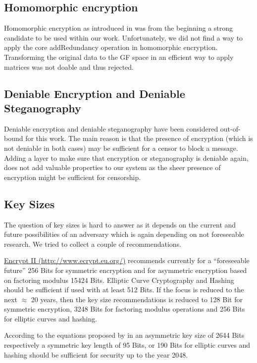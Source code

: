 \subsection{Homomorphic encryption}
Homomorphic encryption as introduced in \cite{feldman1987practical} was from the beginning a strong candidate to be used within our work. Unfortunately, we did not find a way to apply the core addRedundancy operation in homomorphic encryption. Transforming the original data to the GF space in an efficient way to apply matrices was not doable and thus rejected.


\subsection{Deniable Encryption and Deniable Steganography}

Deniable encryption and deniable steganography have been considered out-of-bound for this work. The main reason is that the presence of encryption (which is not deniable in both cases) may be sufficient for a censor to block a message. Adding a layer to make sure that encryption or steganography is deniable again, does not add valuable properties to our system as the sheer presence of encryption might be sufficient for censorship. 

\subsection{Key Sizes\label{sec:keySize}}

The question of key sizes is hard to answer as it depends on the current and future possibilities of an adversary which is again depending on not foreseeable research. We tried to collect a couple of recommendations.

\href{http://www.ecrypt.eu.org/}{Encrypt II (http://www.ecrypt.eu.org/)} recommends currently for a ``foreseeable future'' 256 Bits for symmetric encryption and for asymmetric encryption based on factoring modulus 15424 Bits. Elliptic Curve Cryptography and Hashing should be sufficient if used with at least 512 Bits. If the focus is reduced to the next $\approx$ 20 years, then the key size recommendations is reduced to 128 Bit for symmetric encryption, 3248 Bits for factoring modulus operations and 256 Bits for elliptic curves and hashing.

According to the equations proposed by \citeauthor{Lenstra04keylength.} in \cite{Lenstra04keylength.} an asymmetric key size of 2644 Bits respectively a symmetric key length of 95 Bits, or 190 Bits for elliptic curves and hashing should be sufficient for security up to the year 2048. 


